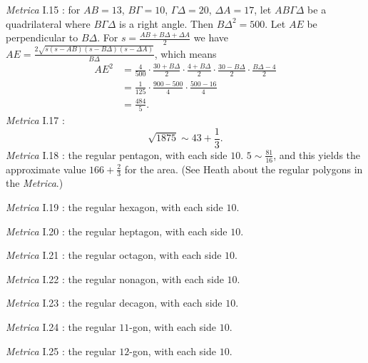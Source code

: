 \documentclass{article}
\theoremstyle{definition}
\begin{document}
{\em Metrica} I.15 \cite[pp.~41--43]{heronisIII}: for $AB=13$, $B\Gamma=10$,
$\Gamma \Delta=20$, $\Delta A=17$, let $AB\Gamma \Delta$ be a quadrilateral where
$B\Gamma \Delta$ is a right angle. Then $B\Delta^2 = 500$. Let $AE$ be perpendicular to $B\Delta$. For
$s=\frac{AB+B\Delta+\Delta A}{2}$ we have
$AE = \frac{2\sqrt{s(s-AB)(s-B\Delta)(s-\Delta A)}}{B\Delta}$, which means
\begin{align*}
AE^2 &= \frac{4}{500} \cdot \frac{30+B\Delta}{2} \cdot
\frac{4+B\Delta}{2} \cdot \frac{30-B\Delta}{2} \cdot \frac{B\Delta-4}{2}\\
&=\frac{1}{125} \cdot \frac{900-500}{4} \cdot \frac{500-16}{4}\\
&=\frac{484}{5}.
\end{align*}
{\em Metrica} I.17 \cite[p.~49]{heronisIII}: 
\[
\sqrt{1875} \sim 43+\frac{1}{3}.
\]
{\em Metrica} I.18 \cite[pp.~51--53]{heronisIII}: the regular pentagon, with each side $10$.
$5 \sim \frac{81}{16}$, and this yields the approximate value
$166+\frac{2}{3}$ for the area. (See Heath \cite[pp.~326--329]{HGMII} about the regular polygons in the {\em Metrica}.)

{\em Metrica} I.19 \cite[pp.~52--55]{heronisIII}: the regular hexagon, with each side $10$. 

{\em Metrica} I.20 \cite[pp.~54--57]{heronisIII}: the regular heptagon, with each side $10$.

{\em Metrica} I.21 \cite[pp.~57--59]{heronisIII}: the regular octagon, with each side $10$.

{\em Metrica} I.22 \cite[pp.~59--61]{heronisIII}: the regular nonagon, with each side $10$.

{\em Metrica} I.23 \cite[p.~61]{heronisIII}: the regular decagon, with each side $10$.

{\em Metrica} I.24 \cite[p.~63]{heronisIII}: the regular $11$-gon, with each side $10$.

{\em Metrica} I.25 \cite[pp.~63--65]{heronisIII}: the regular $12$-gon, with each side $10$.
\end{document}
